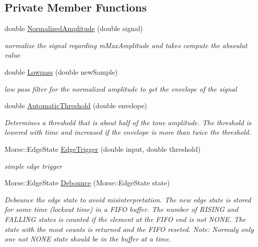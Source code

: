 \subsection*{Private Member Functions}
\begin{DoxyCompactItemize}
\item 
double \hyperlink{classMorseDecode_afbe9abff356a2889ad38e252c2726d07}{Normalized\+Amplitude} (double signal)
\begin{DoxyCompactList}\small\item\em normalize the signal regarding m\+Max\+Amplitude and takes compute the absoulut value \end{DoxyCompactList}\item 
double \hyperlink{classMorseDecode_a04527008e5818221448f082ec516928c}{Lowpass} (double new\+Sample)
\begin{DoxyCompactList}\small\item\em low pass filter for the normalized amplitude to get the envelope of the signal \end{DoxyCompactList}\item 
double \hyperlink{classMorseDecode_af21aeb2136d254ee6fb0139c25dd5d9a}{Automatic\+Threshold} (double envelope)
\begin{DoxyCompactList}\small\item\em Determines a threshold that is about half of the tone amplitude. The threshold is lowered with time and increased if the envelope is more than twice the threshold. \end{DoxyCompactList}\item 
Morse\+::\+Edge\+State \hyperlink{classMorseDecode_a64943543f9a4f2d7a567a59239563adf}{Edge\+Trigger} (double input, double threshold)
\begin{DoxyCompactList}\small\item\em simple edge trigger \end{DoxyCompactList}\item 
Morse\+::\+Edge\+State \hyperlink{classMorseDecode_af7e53eff848faf9e57bb7ae660f2911b}{Debounce} (Morse\+::\+Edge\+State state)
\begin{DoxyCompactList}\small\item\em Debounce the edge state to avoid misinterpretation. The new edge state is stored for some time (lockout time) in a F\+I\+FO buffer. The number of R\+I\+S\+I\+NG and F\+A\+L\+L\+I\+NG states is counted if the element at the F\+I\+FO end is not N\+O\+NE. The state with the most counts is returned and the F\+I\+FO reseted. Note\+: Normaly only one not N\+O\+NE state should be in the buffer at a time. \end{DoxyCompactList}\item 

\end{DoxyCompactItemize}
